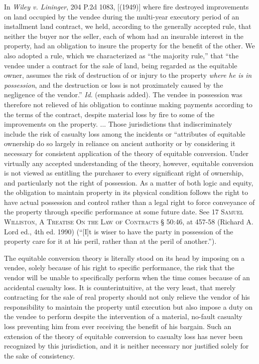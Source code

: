 In \textit{Wiley v. Lininger}, 204 P.2d 1083, [(1949)] where fire destroyed
improvements on land occupied by the vendee during the multi-year executory
period of an installment land contract, we held, according to the generally
accepted rule, that neither the buyer nor the seller, each of whom had an
insurable interest in the property, had an obligation to insure the property
for the benefit of the other. We also adopted a rule, which we characterized as
``the majority rule,'' that ``the vendee under a contract for the sale of land,
being regarded as the equitable owner, assumes the risk of destruction of or
injury to the property \textit{where he is in possession}, and the destruction
or loss is not proximately caused by the negligence of the vendor.''
\textit{Id}. (emphasis added). The vendee in possession was therefore not
relieved of his obligation to continue making payments according to the terms
of the contract, despite material loss by fire to some of the improvements on
the property. ... Those jurisdictions that indiscriminately include the risk of
casualty loss among the incidents or ``attributes{\textquotedbl} of equitable
ownership do so largely in reliance on ancient authority or by considering it
necessary for consistent application of the theory of equitable conversion.
Under virtually any accepted understanding of the theory, however, equitable
conversion is not viewed as entitling the purchaser to every significant right
of ownership, and particularly not the right of possession. As a matter of both
logic and equity, the obligation to maintain property in its physical condition
follows the right to have actual possession and control rather than a legal
right to force conveyance of the property through specific performance at some
future date. See 17 \textsc{Samuel Williston, A Treatise On the Law of
Contracts} {\S} 50:46, at 457-58 (Richard A. Lord ed., 4th ed. 1990) (``[I]t is
wiser to have the party in possession of the property care for it at his peril,
rather than at the peril of another.''). 

The equitable conversion theory is literally stood on its head by imposing on a
vendee, solely because of his right to specific performance, the risk that the
vendor will be unable to specifically perform when the time comes because of an
accidental casualty loss. It is counterintuitive, at the very least, that
merely contracting for the sale of real property should not only relieve the
vendor of his responsibility to maintain the property until execution but also
impose a duty on the vendee to perform despite the intervention of a material,
no-fault casualty loss preventing him from ever receiving the benefit of his
bargain. Such an extension of the theory of equitable conversion to casualty
loss has never been recognized by this jurisdiction, and it is neither
necessary nor justified solely for the sake of consistency. 

